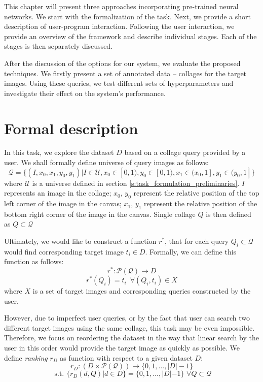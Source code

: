 This chapter will present three approaches incorporating pre-trained neural networks. We start with the formalization of the task. Next, we provide a short description of user-program interaction. Following the user interaction, we provide an overview of the framework and describe individual stages. Each of the stages is then separately discussed. 

After the discussion of the options for our system, we evaluate the proposed techniques. We firstly present a set of annotated data -- collages for the target images. Using these queries, we test different sets of hyperparameters and investigate their effect on the system's performance. 

\section{Formal description}
\label{s:task_formulation}

In this task, we explore the dataset $D$ based on a collage query provided by a user. We shall formally define universe of query images as follows: 
$$
    \mathcal{Q} = \{(I, x_0, x_1, y_0, y_1) | I \in \mathcal{U}, x_0 \in [0,1), y_0 \in [0, 1), x_1 \in (x_0, 1], y_1 \in (y_0, 1] \}
$$
where $\mathcal{U}$ is a universe defined in section \ref{s:task_formulation_preliminaries}. $I$ represents an image in the collage; $x_0$, $y_0$ represent the relative position of the top left corner of the image in the canvas; $x_1$, $y_1$ represent the relative position of the bottom right corner of the image in the canvas. Single collage $Q$ is then defined as $Q \subset \mathcal{Q}$

Ultimately, we would like to construct a function $r^*$, that for each query $Q_i \subset \mathcal{Q}$ would find corresponding target image $t_i \in D$. Formally, we can define this function as follows:
$$
    r^*: \mathcal{P(Q)} \rightarrow D 
$$
$$
    r^*(Q_i) = t_i \,\,\, \forall (Q_i, t_i) \in X
$$
where $X$ is a set of target images and corresponding queries constructed by the user.

However, due to imperfect user queries, or by the fact that user can search two different target images using the same collage, this task may be even impossible. Therefore, we focus on reordering the dataset in the way that linear search by the user in this order would provide the target image as quickly as possible. We define \emph{ranking} $r_{D}$ as function with respect to a given dataset $D$:
$$
    r_D: (D \times \mathcal{P(Q)}) \rightarrow \{0, 1, \ldots, |D|-1  \}
$$
$$
    \text{ s.t. } \{r_D(d, Q) | d \in D \} = \{0, 1, \ldots, |D|-1  \} \,\, \forall Q \subset \mathcal{Q}
$$

